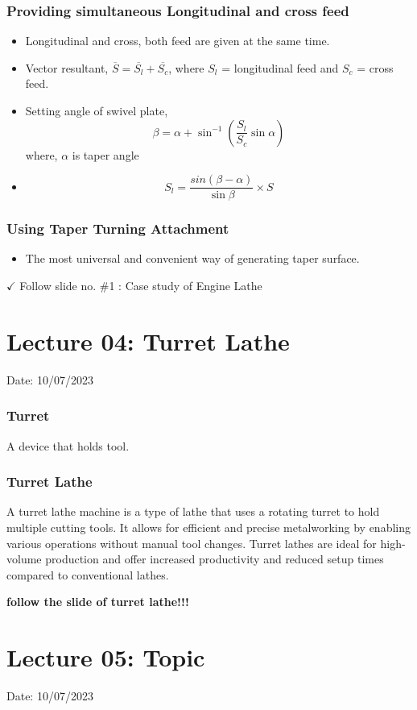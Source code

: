 \documentclass{article}
\begin{document}
\subsubsection*{Providing simultaneous Longitudinal and cross feed}
\begin{itemize}
  \item Longitudinal and cross, both feed are given at the same time.  
  \item Vector resultant, $\overline{S} = \overline{S_l} + \overline{S_c}$, where $S_l$ = longitudinal feed and $S_c$ = cross feed. 
  \item Setting angle of swivel plate, $$\beta = \alpha + \sin^{-1} \left(\frac{S_l}{S_c} \sin \alpha \right)$$ where, $\alpha$ is taper angle 
  \item $$S_l = \frac{sin \left(\beta - \alpha \right)}{\sin \beta} \times S $$
\end{itemize}

\subsubsection*{Using Taper Turning Attachment}
\begin{itemize}
  \item The most universal and convenient way of generating taper surface. 
\end{itemize}

\vspace*{1cm}
$\checkmark$ Follow slide no. \#1 : Case study of Engine Lathe 

\vspace*{1cm}

\section{Lecture 04: Turret Lathe} 
\hfill Date: 10/07/2023

\subsubsection*{Turret}
A device that holds tool. 

\subsubsection*{Turret Lathe}

A turret lathe machine is a type of lathe that uses a rotating turret to hold multiple cutting tools. It allows for efficient and precise metalworking by enabling various operations without manual tool changes. Turret lathes are ideal for high-volume production and offer increased productivity and reduced setup times compared to conventional lathes.

\vspace*{1cm} 
\textbf{follow the slide of turret lathe!!!}
\vspace*{1cm}

\section{Lecture 05: Topic} 
\hfill Date: 10/07/2023
\end{document}
